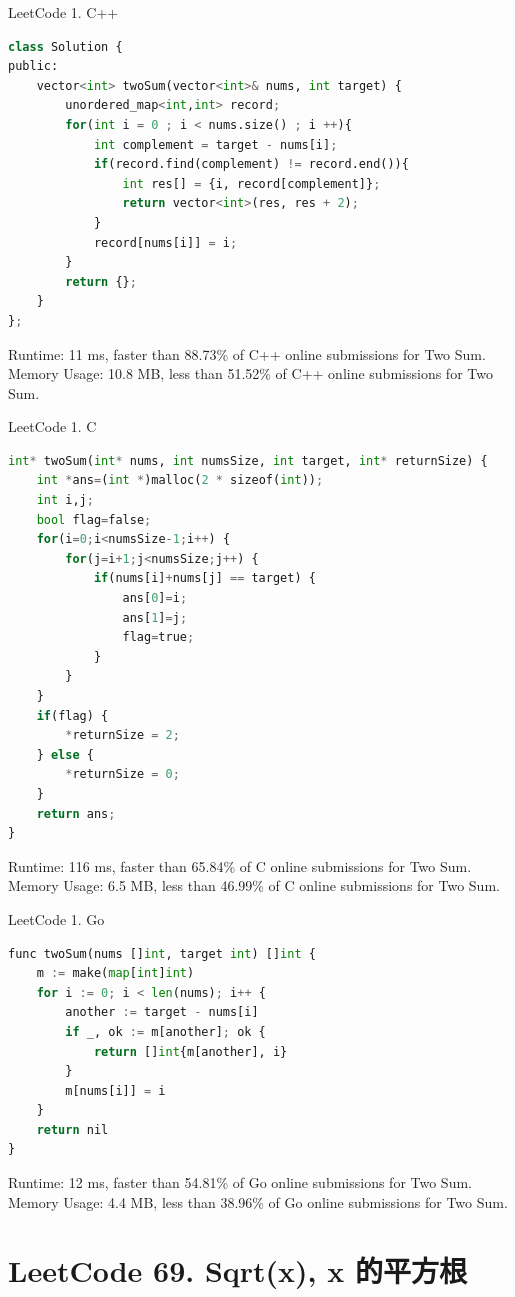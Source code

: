 \documentclass[10pt,UTF8]{ctexart}
\begin{document}
LeetCode 1. C++

\begin{lstlisting}[language={python}]
class Solution {
public:
    vector<int> twoSum(vector<int>& nums, int target) {
        unordered_map<int,int> record;
        for(int i = 0 ; i < nums.size() ; i ++){
            int complement = target - nums[i];
            if(record.find(complement) != record.end()){
                int res[] = {i, record[complement]};
                return vector<int>(res, res + 2);
            }
            record[nums[i]] = i;
        }
        return {};    
    }
};
\end{lstlisting}
Runtime: 11 ms, faster than 88.73\% of C++ online submissions for Two Sum.
Memory Usage: 10.8 MB, less than 51.52\% of C++ online submissions for Two Sum.

LeetCode 1. C

\begin{lstlisting}[language={python}]
int* twoSum(int* nums, int numsSize, int target, int* returnSize) {
    int *ans=(int *)malloc(2 * sizeof(int));
    int i,j;
    bool flag=false; 
    for(i=0;i<numsSize-1;i++) {
        for(j=i+1;j<numsSize;j++) {
            if(nums[i]+nums[j] == target) {
                ans[0]=i;
                ans[1]=j;
                flag=true;
            }
        }
    }
    if(flag) {
        *returnSize = 2;
    } else {
        *returnSize = 0;
    }
    return ans;
}
\end{lstlisting}
Runtime: 116 ms, faster than 65.84\% of C online submissions for Two Sum.
Memory Usage: 6.5 MB, less than 46.99\% of C online submissions for Two Sum.

LeetCode 1. Go

\begin{lstlisting}[language={python}]
func twoSum(nums []int, target int) []int {
    m := make(map[int]int)
    for i := 0; i < len(nums); i++ {
        another := target - nums[i]
        if _, ok := m[another]; ok {
            return []int{m[another], i}
        }
        m[nums[i]] = i
    }
    return nil
}
\end{lstlisting}
Runtime: 12 ms, faster than 54.81\% of Go online submissions for Two Sum.
Memory Usage: 4.4 MB, less than 38.96\% of Go online submissions for Two Sum.


\section{LeetCode 69. Sqrt(x), x 的平方根}
\end{document}
